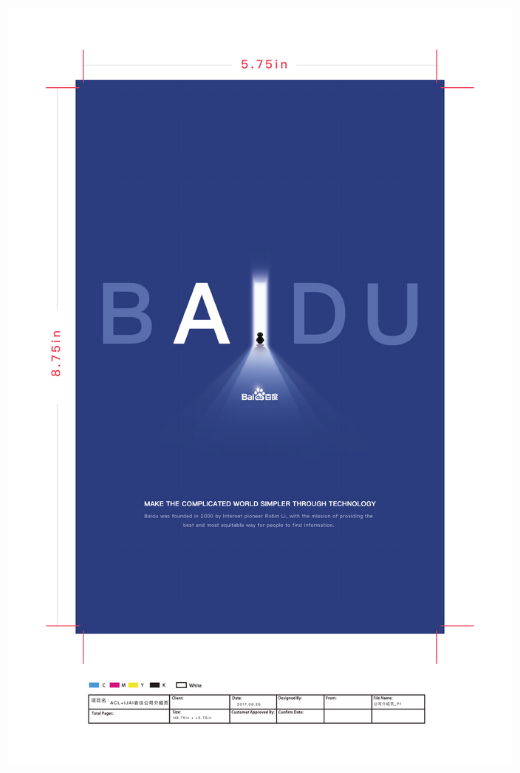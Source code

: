 \thispagestyle{empty}
\begin{center}
  \vfill
  \includegraphics[width=\textwidth]{content/ads/platinum/baidu.pdf}
  \vfill
\end{center}
\clearpage
%


